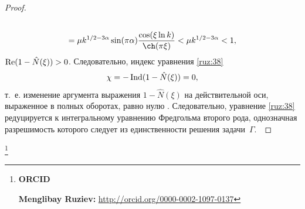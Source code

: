 \begin{proof}
\begin{multline*}
\\
=\mu k^{{1}/{2}-3\alpha}\sin(\pi\alpha)\frac{\cos(\xi\ln k)}{\ch(\pi\xi)}<\mu k^{{1}/{2}-3\alpha}<1,
\end{multline*}
 $\mathop{\rm Re}(1-\hat N(\xi))>0$.
Следовательно, индекс уравнения \eqref{ruz:38} $$\chi=-\mathop{\rm Ind}(1-\hat N(\xi))=0,$$
 т.~е. изменение аргумента выражения $1-\hat N (\xi)$ на действительной оси, выраженное в полных
 оборотах, равно нулю \cite[с.~56]{ruz:bib:12}. 
 Следовательно, уравнение \eqref{ruz:38} редуцируется к интегральному уравнению Фредгольма
  второго рода, однозначная разрешимость которого следует из единственности решения задачи~\hyperlink{ruz:G}{$\Gamma $}.~\end{proof}



\thanks{{\bf ORCID}

{\bf Menglibay Ruziev:} \url{http://orcid.org/0000-0002-1097-0137}
}

\RusRef


